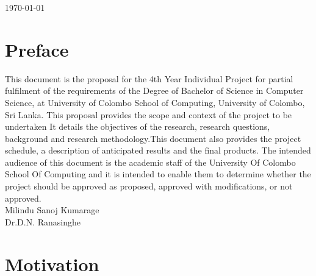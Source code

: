 \documentclass[12pt]{article}
\begin{document}
\begin{titlepage}

{\large \today}\\[3cm] %


 

\vfill %

\end{titlepage}
 

\tableofcontents

\clearpage 
\section{Preface}

This document is the proposal for the 4th Year Individual Project for partial fulfilment of
the requirements of the Degree of Bachelor of Science in Computer Science, at University of
Colombo School of Computing, University of Colombo, Sri Lanka.
This proposal provides the scope and context of the project to be undertaken It details
the objectives of the research, research questions, background and research methodology.This
document also provides the project schedule, a description of anticipated results and the final
products.
The intended audience of this document is the academic staff of the University Of Colombo
School Of Computing and it is intended to enable them to determine whether the project should
be approved as proposed, approved with modifications, or not approved.
\\
[7em]
Milindu Sanoj Kumarage\\
[7em]
Dr.D.N. Ranasinghe\\

\clearpage 
\section{Motivation}
\end{document}
